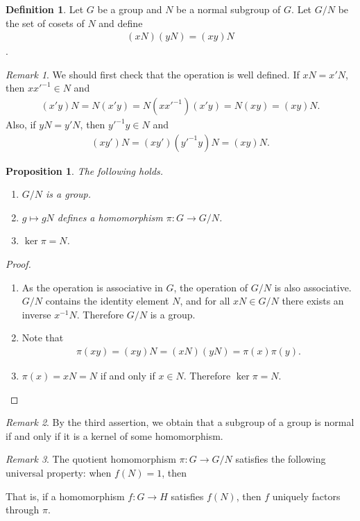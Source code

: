\documentclass[12pt]{report}
\theoremstyle{plain}
\newtheorem{proposition}[theorem]{Proposition}
\theoremstyle{remark}
\newtheorem*{remark}{Remark}
\theoremstyle{definition}
\newtheorem{definition}[theorem]{Definition}
\begin{document}
\begin{definition}
    Let $G$ be a group and $N$ be a normal subgroup of $G$. Let $G/N$ be the set of cosets of $N$ and define
    \begin{align*}
        (xN)(yN)=(xy)N
    \end{align*}.
\end{definition}
\begin{remark}
    We should first check that the operation is well defined. If $xN=x'N$, then $xx'^{-1}\in N$ and
    \begin{align*}
        (x'y)N = N(x'y) = N(xx'^{-1})(x'y) = N(xy) = (xy)N.
    \end{align*}
    Also, if $yN=y'N$, then $y'^{-1}y\in N$ and
    \begin{align*}
        (xy')N=(xy')(y'^{-1}y)N = (xy)N.
    \end{align*}
\end{remark}

\begin{proposition}
    The following holds.
    \begin{enumerate}
        \item $G/N$ is a group.
        \item $g\mapsto gN$ defines a homomorphism $\pi:G\rightarrow G/N$.
        \item $\ker \pi = N$.
    \end{enumerate}
\end{proposition}
\begin{proof}
    \begin{enumerate}
        \item As the operation is associative in $G$, the operation of $G/N$ is also associative. $G/N$ contains the identity element $N$, and for all $xN\in G/N$ there exists an inverse $x^{-1}N$. Therefore $G/N$ is a group.
        \item Note that
        \begin{align*}
            \pi(xy) = (xy)N = (xN)(yN)=\pi(x)\pi(y).
        \end{align*}
        \item $\pi(x) = xN = N$ if and only if $x\in N$. Therefore $\ker \pi = N$.
    \end{enumerate}
\end{proof}
\begin{remark}
    By the third assertion, we obtain that a subgroup of a group is normal if and only if it is a kernel of some homomorphism.
\end{remark}
\begin{remark}
    The quotient homomorphism $\pi:G\rightarrow G/N$ satisfies the following universal property: when $f(N)=1$, then
    \begin{figure}[H]
    \centering
    \end{figure}
    \noindent
    That is, if a homomorphism $f:G\rightarrow H$ satisfies $f(N)$, then $f$ uniquely factors through $\pi$.
\end{remark}
\end{document}
